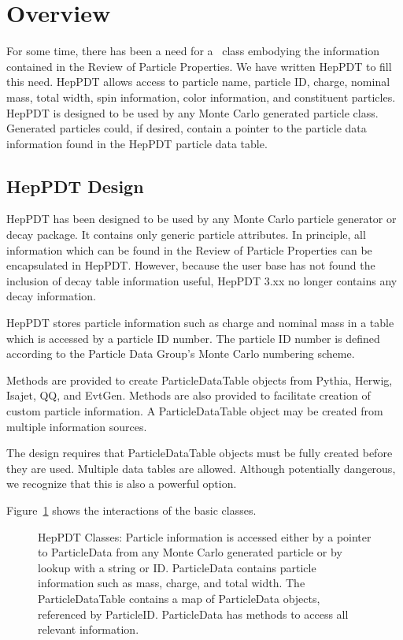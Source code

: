 
\section{Overview}

For some time, there has been a need for a \cpp\ class embodying the
information contained in the Review of Particle Properties\cite{pdg}.
We have written HepPDT to fill this need.  
HepPDT allows access
to particle name, particle ID, charge, nominal mass,  total width,
spin information, color information, and constituent particles.
HepPDT is designed to be used by any Monte Carlo generated particle class. 
Generated particles could, if desired, contain a
pointer to the particle data information found in the HepPDT
particle data table.  

\subsection{HepPDT Design}

HepPDT has been designed to be used by any Monte Carlo particle generator
or decay package.  It contains only generic particle attributes.
In principle, all information which can be found in
the Review of Particle Properties\cite{pdg} can be encapsulated in HepPDT.
However, because the user base has not found the inclusion of decay table 
information useful, HepPDT 3.xx no longer contains any decay information.

HepPDT stores particle information such as charge and nominal mass  
in a table which is accessed by a particle ID number.  
The particle ID number is defined according to the Particle Data Group's
Monte Carlo numbering scheme\cite{scheme}.  

Methods are provided to create ParticleDataTable objects from
Pythia, Herwig, Isajet, QQ, and EvtGen.  Methods
are also provided to facilitate creation of custom particle 
information.  A ParticleDataTable object may be created from
multiple information sources.

The design requires that ParticleDataTable objects must be fully created
before they are used.  Multiple data tables are allowed.  Although
potentially dangerous, we recognize that this is also a powerful option.

Figure~\ref{fig:a} shows the interactions of the basic classes.

\begin{figure}
\caption{HepPDT Classes: 
Particle information is accessed either by a pointer to ParticleData from any
Monte Carlo generated particle or by lookup with a string or ID.  
ParticleData contains particle information such as mass, charge,
and total width.  
The ParticleDataTable contains a map of ParticleData objects,
referenced by ParticleID.
ParticleData has methods to access all relevant information. }
\label{fig:a}
\end{figure}

